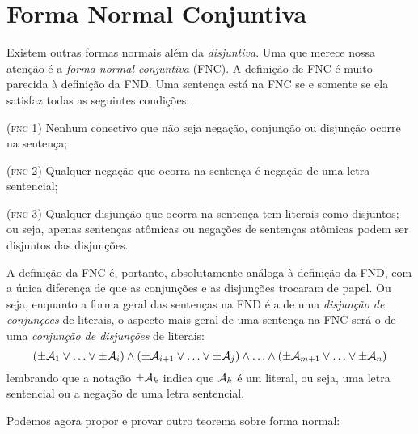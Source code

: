 


\section{Forma Normal Conjuntiva}
\label{s:CNF}

Existem outras formas normais além da \emph{disjuntiva}.
Uma que merece nossa atenção é a \emph{forma normal conjuntiva} (FNC).
A definição de FNC é muito parecida à definição da FND.
Uma sentença está na FNC se e somente se ela satisfaz todas as seguintes condições:
	\begin{earg}
		\item[(\textsc{fnc 1})] Nenhum conectivo que não seja negação, conjunção ou disjunção ocorre na sentença;
		\item[(\textsc{fnc 2})] Qualquer negação que ocorra na sentença é negação de uma letra sentencial;
		\item[(\textsc{fnc 3})] Qualquer disjunção que ocorra na sentença tem literais como disjuntos; ou seja, apenas sentenças atômicas ou negações de sentenças atômicas podem ser disjuntos das disjunções.
	\end{earg}

\noindent A definição da FNC é, portanto, absolutamente análoga à definição da FND, com a única diferença de que as conjunções e as disjunções trocaram de papel.
Ou seja, enquanto a forma geral das sentenças na FND é a de uma \textit{disjunção de conjunções} de literais, o aspecto mais geral de uma sentença na FNC será o de uma \textit{conjunção de disjunções} de literais:
$$(\pm \mathcal{A}_1 \lor \ldots \lor \pm \mathcal{A}_i) \land (\pm \mathcal{A}_{i+1} \lor \ldots \lor \pm\mathcal{A}_j) \land \ldots \land (\pm\mathcal{A}_{m+1} \lor\ldots \lor \pm \mathcal{A}_n)$$
lembrando que a notação $\pm\mathcal{A}_k$ indica que $\mathcal{A}_k$ é um literal, ou seja, uma letra sentencial ou a negação de uma letra sentencial.

Podemos agora propor e provar outro teorema sobre forma normal:

